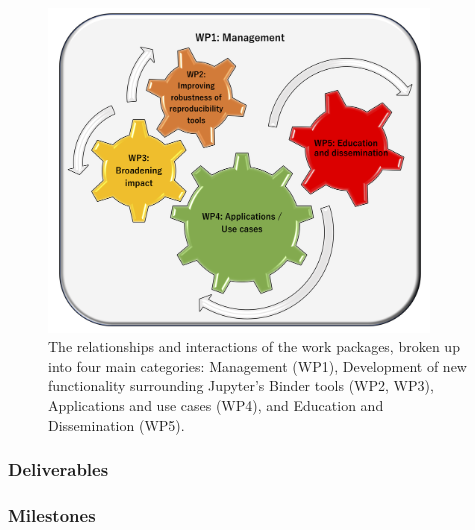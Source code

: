 \begin{figure}[htb]
  \centering
  \includegraphics[width=0.9\textwidth]{images/WP_low.png}
  \caption{
    \label{fig:workpackages}
    The relationships and interactions of the work packages,
    broken up into four main categories: Management (WP1),
    Development of new functionality surrounding Jupyter's Binder tools (WP2, WP3),
    Applications and use cases (WP4),
    and Education and Dissemination (WP5).
  }
\end{figure}


\ganttchart[draft,xscale=.33,milestones]

\ifgrantagreement\else
\newpage
\subsubsection{Deliverables}\label{sec:deliverables}
\fi


\newpage
\subsubsection{Milestones}\label{sec:milestones}









